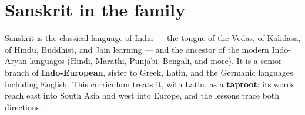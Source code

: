 \section*{Sanskrit in the family}

Sanskrit is the classical language of India — the tongue of the Vedas, of Kālidāsa, of Hindu, Buddhist, and Jain learning — and the ancestor of the modern Indo-Aryan languages (Hindi, Marathi, Punjabi, Bengali, and more). It is a senior branch of \textbf{Indo-European}, sister to Greek, Latin, and the Germanic languages including English. This curriculum treats it, with Latin, as a \textbf{taproot}: its words reach east into South Asia and west into Europe, and the lessons trace both directions.
